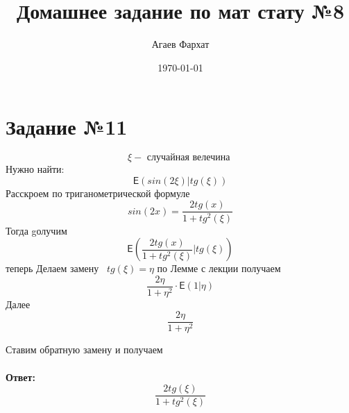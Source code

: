 \documentclass[a4paper, 12pt]{article} %
\author{Агаев Фархат}
\title{Домашнее задание по мат стату №8}
\date{\today}
\newcommand{\Expect}{\mathsf{E}}
\begin{document}

\maketitle
\section*{Задание №11}
\[\xi  - \text{ случайная велечина } \]
Нужно найти:
\[ \Expect(sin(2 \xi) | tg (\xi)) \]
Расскроем по триганометрической формуле 
\[sin(2x) = \frac{2tg(x)}{1 + tg^2(\xi)} \]
Тогда 
gолучим
\[ \Expect(\frac{2tg(x)}{1 + tg^2(\xi)} | tg (\xi)) \]
теперь Делаем замену  $tg(\xi) = \eta$ по Лемме с лекции получаем
\[\frac{2\eta}{1 + \eta^2} \cdot \Expect(1 | \eta)\] 
Далее 
\[\frac{2\eta}{1 + \eta^2} \]

Ставим обратную замену и получаем  \\\\
\textbf{Ответ:}
\[\frac{2tg(\xi)}{1 + tg^2(\xi)} \]
\end{document}
